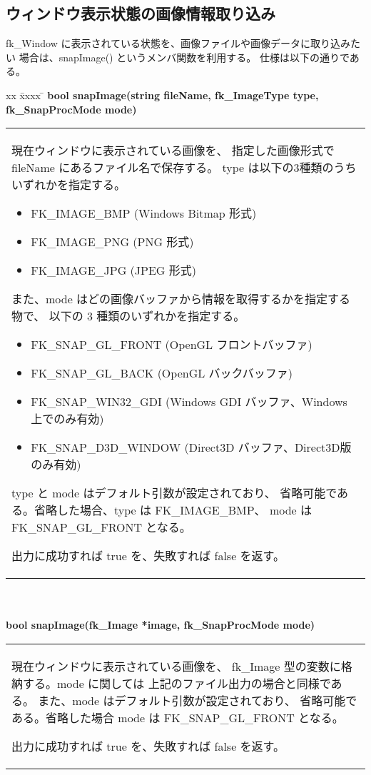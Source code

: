 \subsection{ウィンドウ表示状態の画像情報取り込み}
fk\_Window に表示されている状態を、画像ファイルや画像データに取り込みたい
場合は、snapImage() というメンバ関数を利用する。
仕様は以下の通りである。
\begin{tabbing}
xx \= xxxx \= \kill
\> \textbf{bool snapImage(string fileName,
	fk\_ImageType type, fk\_SnapProcMode mode)} \\
	\> \> \begin{tabular}{p{15cm}}
		現在ウィンドウに表示されている画像を、
		指定した画像形式で fileName にあるファイル名で保存する。
		type は以下の3種類のうちいずれかを指定する。
		\begin{itemize}
		 \item FK\_IMAGE\_BMP (Windows Bitmap 形式)
		 \item FK\_IMAGE\_PNG (PNG 形式)
		 \item FK\_IMAGE\_JPG (JPEG 形式)
		\end{itemize}
		また、mode はどの画像バッファから情報を取得するかを指定する物で、
		以下の 3 種類のいずれかを指定する。
		\begin{itemize}
		 \item FK\_SNAP\_GL\_FRONT (OpenGL フロントバッファ)
		 \item FK\_SNAP\_GL\_BACK (OpenGL バックバッファ)
		 \item FK\_SNAP\_WIN32\_GDI
		 (Windows GDI バッファ、Windows 上でのみ有効)
		 \item FK\_SNAP\_D3D\_WINDOW
		(Direct3D バッファ、Direct3D版のみ有効)
		\end{itemize}

		type と mode はデフォルト引数が設定されており、
		省略可能である。省略した場合、type は FK\_IMAGE\_BMP、
		mode は FK\_SNAP\_GL\_FRONT となる。

		出力に成功すれば true を、失敗すれば false を返す。

	\end{tabular} \\ \\
\> \textbf{bool snapImage(fk\_Image *image, fk\_SnapProcMode mode)} \\
	\> \> \begin{tabular}{p{15cm}}
		現在ウィンドウに表示されている画像を、
		fk\_Image 型の変数に格納する。mode に関しては
		上記のファイル出力の場合と同様である。
		また、mode はデフォルト引数が設定されており、
		省略可能である。省略した場合 mode は FK\_SNAP\_GL\_FRONT となる。

		出力に成功すれば true を、失敗すれば false を返す。
	\end{tabular} \\ \\
\end{tabbing}


